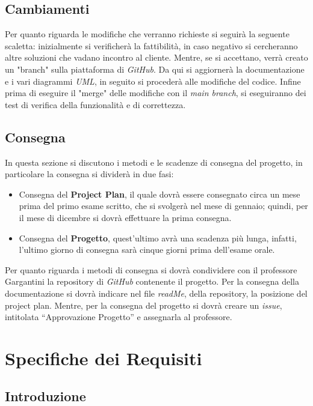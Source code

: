 \documentclass[12pt, letterpaper]{book}
\begin{document}
\section{Cambiamenti}

Per quanto riguarda le modifiche che verranno richieste si seguirà la seguente scaletta: inizialmente si verificherà la fattibilità, in caso negativo si cercheranno altre soluzioni che vadano incontro al cliente. Mentre, se si accettano, verrà creato un "branch" sulla piattaforma di \textit{GitHub}. Da qui si aggiornerà la documentazione e i vari diagrammi \textit{UML}, in seguito si procederà alle modifiche del codice. Infine prima di eseguire il "merge" delle modifiche con il \textit{main branch}, si eseguiranno dei test di verifica della funzionalità e di correttezza.

\section{Consegna}


In questa sezione si discutono i metodi e le scadenze di consegna del progetto, in particolare la consegna si dividerà in due fasi:


\begin{itemize}
    \item Consegna del \textbf{Project Plan}, il quale dovrà essere consegnato circa un mese prima del primo esame scritto, che si svolgerà nel mese di gennaio; quindi, per il mese di dicembre si dovrà effettuare la prima consegna.
    \item Consegna del \textbf{Progetto}, quest'ultimo avrà una scadenza più lunga, infatti, l'ultimo giorno di consegna sarà cinque giorni prima dell'esame orale.
\end{itemize}
Per quanto riguarda i metodi di consegna si dovrà condividere con il professore Gargantini la repository di \textit{GitHub} contenente il progetto. Per la consegna della documentazione si dovrà indicare nel file \textit{readMe}, della repository, la posizione del project plan. Mentre, per la consegna del progetto si dovrà creare un \textit{issue}, intitolata “Approvazione Progetto” e assegnarla al professore.

\chapter{Specifiche dei Requisiti}

\section{Introduzione}
\end{document}
